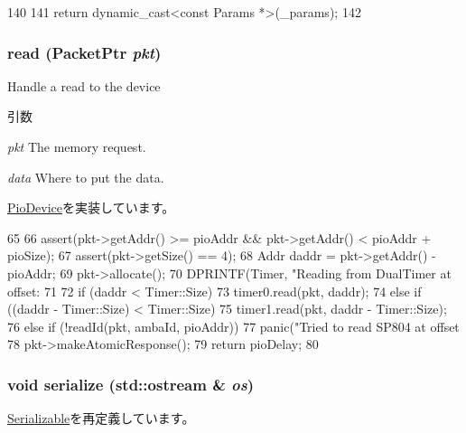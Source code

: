 \begin{DoxyCode}
140     {
141         return dynamic_cast<const Params *>(_params);
142     }
\end{DoxyCode}
\hypertarget{classSp804_a613ec7d5e1ec64f8d21fec78ae8e568e}{
\subsubsection[{read}]{ read ({\bf PacketPtr} {\em pkt})}}
\label{classSp804_a613ec7d5e1ec64f8d21fec78ae8e568e}
Handle a read to the device 
\begin{DoxyParams}{引数}
\item[{\em pkt}]The memory request. \item[{\em data}]Where to put the data. \end{DoxyParams}


\hyperlink{classPioDevice_a842312590432036092c422c87a442358}{PioDevice}を実装しています。


\begin{DoxyCode}
65 {
66     assert(pkt->getAddr() >= pioAddr && pkt->getAddr() < pioAddr + pioSize);
67     assert(pkt->getSize() == 4);
68     Addr daddr = pkt->getAddr() - pioAddr;
69     pkt->allocate();
70     DPRINTF(Timer, "Reading from DualTimer at offset: %
71 
72     if (daddr < Timer::Size)
73         timer0.read(pkt, daddr);
74     else if ((daddr - Timer::Size) < Timer::Size)
75         timer1.read(pkt, daddr - Timer::Size);
76     else if (!readId(pkt, ambaId, pioAddr))
77         panic("Tried to read SP804 at offset %
78     pkt->makeAtomicResponse();
79     return pioDelay;
80 }
\end{DoxyCode}
\hypertarget{classSp804_a53e036786d17361be4c7320d39c99b84}{
\subsubsection[{serialize}]{\setlength{\rightskip}{0pt plus 5cm}void serialize (std::ostream \& {\em os})}}
\label{classSp804_a53e036786d17361be4c7320d39c99b84}


\hyperlink{classSerializable_ad6272f80ae37e8331e3969b3f072a801}{Serializable}を再定義しています。


